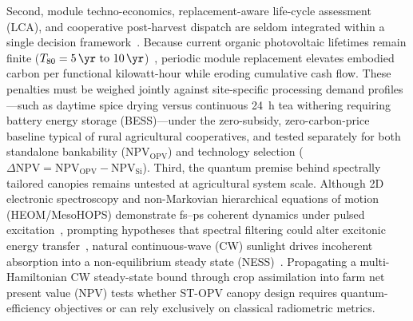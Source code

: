 \documentclass[preprint,12pt,a4paper]{elsarticle}
\begin{document}
Second, module techno-economics, replacement-aware life-cycle assessment (LCA), and cooperative post-harvest dispatch are seldom integrated within a single decision framework~\cite{Ravilla2024,Zidane2025}. Because current organic photovoltaic lifetimes remain finite ($T_{80} = \qtyrange{5}{10}{\yr}$)~\cite{Machui2014,Gambhir2016,Wang2023,Ravilla2024}, periodic module replacement elevates embodied carbon per functional kilowatt-hour while eroding cumulative cash flow. These penalties must be weighed jointly against site-specific processing demand profiles---such as daytime spice drying versus continuous \qty{24}{\hour} tea withering requiring battery energy storage (BESS)---under the zero-subsidy, zero-carbon-price baseline typical of rural agricultural cooperatives, and tested separately for both standalone bankability ($\mathrm{NPV}_{\mathrm{OPV}}$) and technology selection ($\Delta\mathrm{NPV} = \mathrm{NPV}_{\mathrm{OPV}} - \mathrm{NPV}_{\mathrm{Si}}$). Third, the quantum premise behind spectrally tailored canopies remains untested at agricultural system scale. Although 2D electronic spectroscopy and non-Markovian hierarchical equations of motion (HEOM/\allowbreak MesoHOPS) demonstrate fs--ps coherent dynamics under pulsed excitation~\cite{Tanimura1989,Suess2015,Varvelo2021,Lambert2023,Citty2024,TeguiaKouam2026}, prompting hypotheses that spectral filtering could alter excitonic energy transfer~\cite{Kassal2013,Kim2025SciAdv}, natural continuous-wave (CW) sunlight drives incoherent absorption into a non-equilibrium steady state (NESS)~\cite{BrumerShapiro2012,Kassal2013}. Propagating a multi-Hamiltonian CW steady-state bound through crop assimilation into farm net present value (NPV) tests whether ST-OPV canopy design requires quantum-efficiency objectives or can rely exclusively on classical radiometric metrics.
\end{document}
